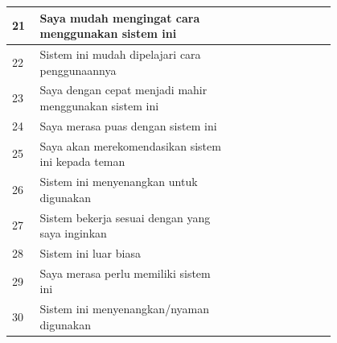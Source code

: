 \begin{longtable}{|p{0.05\linewidth}|p{0.5\linewidth}|p{0.05\linewidth}|p{0.05\linewidth}|p{0.05\linewidth}|p{0.05\linewidth}|p{0.05\linewidth}|}
      \hline
      21          & Saya mudah mengingat cara menggunakan sistem ini                                                      &                                         &             &            &            &             \\
      \hline
      22          & Sistem ini mudah dipelajari cara penggunaannya                                                        &                                         &             &            &            &             \\
      \hline
      23          & Saya dengan cepat menjadi mahir menggunakan sistem ini                                                &                                         &             &            &            &             \\
      \hline
      24          & Saya merasa puas dengan sistem ini                                                                    &                                         &             &            &            &             \\
      \hline
      25          & Saya akan merekomendasikan sistem ini kepada teman                                                    &                                         &             &            &            &             \\
      \hline
      26          & Sistem ini menyenangkan untuk digunakan                                                               &                                         &             &            &            &             \\
      \hline
      27          & Sistem bekerja sesuai dengan yang saya inginkan                                                       &                                         &             &            &            &             \\
      \hline
      28          & Sistem ini luar biasa                                                                                 &                                         &             &            &            &             \\
      \hline
      29          & Saya merasa perlu memiliki sistem ini                                                                 &                                         &             &            &            &             \\
      \hline
      30          & Sistem ini menyenangkan/nyaman digunakan                                                              &                                         &             &            &            &             \\
      \hline
\end{longtable}

